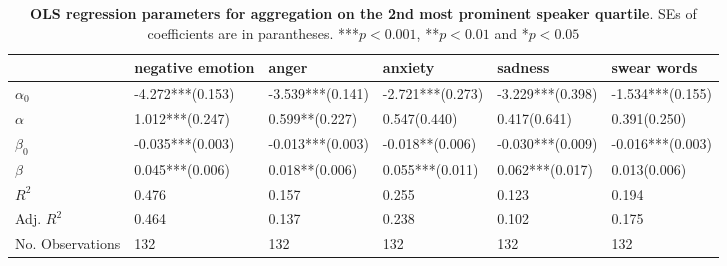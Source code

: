 \begin{table}[h]\centering
\caption{\textbf{OLS regression parameters for aggregation on the 2nd most prominent speaker quartile}. SEs of coefficients are in parantheses. ***$p < 0.001$, **$p < 0.01$ and *$p < 0.05$}
	\label{fig: Verbosity_3}
\begin{adjustbox}{width=\linewidth, center}
	\begin{tabular}{llllll}
	\toprule
	{} &            negative emotion &                                 anger &                                                   anxiety &                                                   sadness &                                               swear words \\
	\midrule
	$\alpha_0$       &            -4.272***(0.153) &                      -3.539***(0.141) &                                          -2.721***(0.273) &                                          -3.229***(0.398) &                                          -1.534***(0.155) \\
	$\alpha$         &  \phantom{-}1.012***(0.247) &  \phantom{-}0.599**\phantom{*}(0.227) &  \phantom{-}0.547\phantom{*}\phantom{*}\phantom{*}(0.440) &  \phantom{-}0.417\phantom{*}\phantom{*}\phantom{*}(0.641) &  \phantom{-}0.391\phantom{*}\phantom{*}\phantom{*}(0.250) \\
	$\beta_0$        &            -0.035***(0.003) &                      -0.013***(0.003) &                                -0.018**\phantom{*}(0.006) &                                          -0.030***(0.009) &                                          -0.016***(0.003) \\
	$\beta$          &  \phantom{-}0.045***(0.006) &  \phantom{-}0.018**\phantom{*}(0.006) &                                \phantom{-}0.055***(0.011) &                                \phantom{-}0.062***(0.017) &  \phantom{-}0.013\phantom{*}\phantom{*}\phantom{*}(0.006) \\
	$R^2$            &                       0.476 &                                 0.157 &                                                     0.255 &                                                     0.123 &                                                     0.194 \\
	Adj. $R^2$       &                       0.464 &                                 0.137 &                                                     0.238 &                                                     0.102 &                                                     0.175 \\
	No. Observations &                         132 &                                   132 &                                                       132 &                                                       132 &                                                       132 \\
	\bottomrule
	\end{tabular}
	
\end{adjustbox}
	\end{table}

